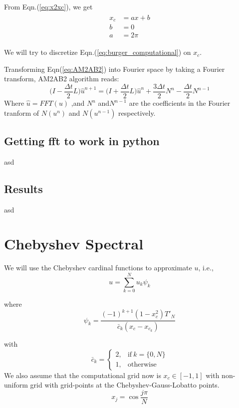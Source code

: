 \documentclass{article}
\begin{document}
From Eqn.(\ref{eq:x2xc}), we get
\begin{align}\label{eq:x2xc_Fourier}
 \begin{split}
  x_{c} &= ax + b\\
  b     &= 0\\
  a     &= 2\pi
 \end{split}
\end{align}

We will try to discretize Eqn.(\ref{eq:burger_computational}) on $x_{c}$. 

Transforming Eqn(\ref{eq:AM2AB2}) into Fourier space by taking a Fourier transform,  AM2AB2 algorithm reads:
\begin{equation}\label{eq:AM2AB2_Fourier}
 \bigg( I - \frac{\Delta t}{2} L \bigg) \hat{u}^{n+1} = \bigg( I + \frac{\Delta t}{2} L \bigg)\hat{u}^{n} + \frac{3 \Delta t}{2} N^{n} - \frac{\Delta t}{2} N^{n-1}
\end{equation}
Where $\hat{u} = FFT(u)$ ,and $N^{n}$ and$N^{n-1}$ are the coefficients in the Fourier tranform of $N(u^{n})$ and $N(u^{n-1})$ respectively.
\subsection{Getting fft to work in python}
asd
\subsection{Results}
asd
\section{Chebyshev Spectral}
We will use the Chebyshev cardinal functions to approximate $u$, i.e., $$u = \sum_{k=0}^{N} u_{k}\psi_{k} $$

where $$\psi_{k} = \frac{(-1)^{k+1}(1-x_{c}^{2})T'_{N}}{\bar{c}_{k} (x_{c}-x_{c_{k}})} $$

with $$\bar{c}_{k} =
    \begin{cases}
      2, & \text{if}\ k=\{0, N\} \\
      1, & \text{otherwise}
    \end{cases}$$
We also assume that the computational grid now is $x_{c} \in [-1, 1]$ with non-uniform grid with grid-points at the Chebyshev-Gauss-Lobatto points.
\begin{equation*}
 x_{j} = \cos{\frac{j \pi}{N}}
\end{equation*}
\end{document}
